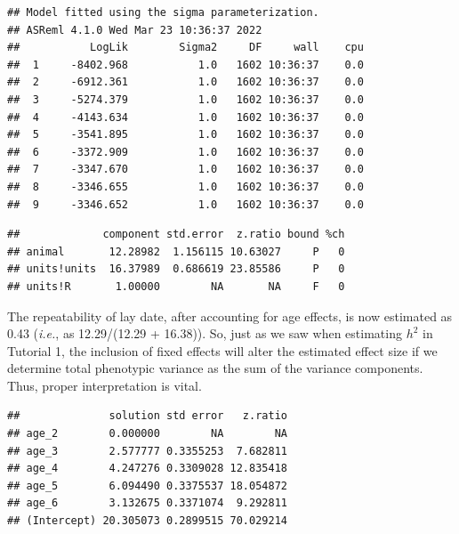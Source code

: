 \documentclass[
  12pt,
]{book}
\newenvironment{Shaded}{\begin{snugshade}}{\end{snugshade}}
\newcommand{\DataTypeTok}[1]{\textcolor[rgb]{0.13,0.29,0.53}{#1}}
\newcommand{\KeywordTok}[1]{\textcolor[rgb]{0.13,0.29,0.53}{\textbf{#1}}}
\newcommand{\NormalTok}[1]{#1}
\newcommand{\OperatorTok}[1]{\textcolor[rgb]{0.81,0.36,0.00}{\textbf{#1}}}
\newcommand{\OtherTok}[1]{\textcolor[rgb]{0.56,0.35,0.01}{#1}}
\newcommand{\StringTok}[1]{\textcolor[rgb]{0.31,0.60,0.02}{#1}}
\begin{document}
\begin{verbatim}
## Model fitted using the sigma parameterization.
## ASReml 4.1.0 Wed Mar 23 10:36:37 2022
##           LogLik        Sigma2     DF     wall    cpu
##  1     -8402.968           1.0   1602 10:36:37    0.0
##  2     -6912.361           1.0   1602 10:36:37    0.0
##  3     -5274.379           1.0   1602 10:36:37    0.0
##  4     -4143.634           1.0   1602 10:36:37    0.0
##  5     -3541.895           1.0   1602 10:36:37    0.0
##  6     -3372.909           1.0   1602 10:36:37    0.0
##  7     -3347.670           1.0   1602 10:36:37    0.0
##  8     -3346.655           1.0   1602 10:36:37    0.0
##  9     -3346.652           1.0   1602 10:36:37    0.0
\end{verbatim}

\begin{Shaded}
\end{Shaded}

\begin{verbatim}
##             component std.error  z.ratio bound %ch
## animal       12.28982  1.156115 10.63027     P   0
## units!units  16.37989  0.686619 23.85586     P   0
## units!R       1.00000        NA       NA     F   0
\end{verbatim}

The repeatability of lay date, after accounting for age effects, is now estimated as 0.43 (\emph{i.e.}, as 12.29/(12.29 + 16.38)).
So, just as we saw when estimating \(h^2\) in Tutorial 1, the inclusion of fixed effects will alter the estimated effect size if we determine total phenotypic variance as the sum of the variance components. Thus, proper interpretation is vital.

\begin{Shaded}
\end{Shaded}

\begin{verbatim}
##              solution std error   z.ratio
## age_2        0.000000        NA        NA
## age_3        2.577777 0.3355253  7.682811
## age_4        4.247276 0.3309028 12.835418
## age_5        6.094490 0.3375537 18.054872
## age_6        3.132675 0.3371074  9.292811
## (Intercept) 20.305073 0.2899515 70.029214
\end{verbatim}
\end{document}
